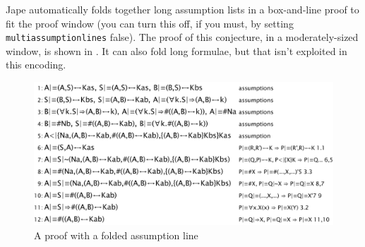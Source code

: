 Jape automatically folds together long assumption lists in a box-and-line proof to fit the proof window (you can turn this off, if you must, by setting \texttt{multiassumptionlines} false). The proof of this conjecture, in a moderately-sized window, is shown in . It can also fold long formulae, but that isn't exploited in this encoding.

\begin{figure}
\centering
\includegraphics[scale=0.5]{pics/BAN/NSexample1}
\caption{A proof with a folded assumption line}
\label{fig:BAN:NSexample1}
\end{figure}

 